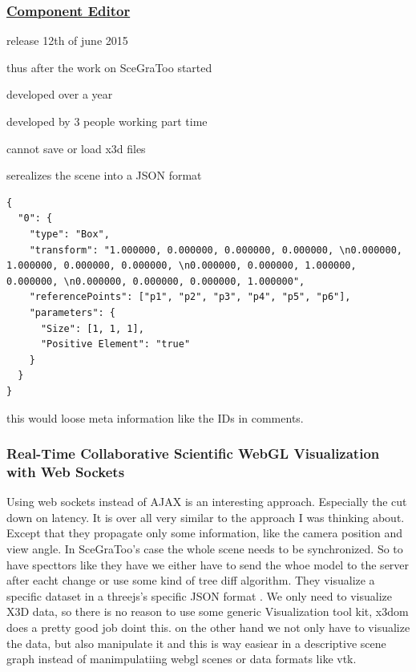 \clearpage
\subsubsection{\texorpdfstring{\href{https://github.com/x3dom/component-editor}{Component
Editor}}{Component Editor}}\label{component-editor30}

\begin{itemize*}
\item release 12th of june 2015
\item thus after the work on SceGraToo started
\item developed over a year
\item developed by 3 people working part time
\item cannot save or load x3d files
\item serealizes the scene into a JSON format
\end{itemize*}

\begin{verbatim}
{
  "0": {
    "type": "Box",
    "transform": "1.000000, 0.000000, 0.000000, 0.000000, \n0.000000, 1.000000, 0.000000, 0.000000, \n0.000000, 0.000000, 1.000000, 0.000000, \n0.000000, 0.000000, 0.000000, 1.000000",
    "referencePoints": ["p1", "p2", "p3", "p4", "p5", "p6"],
    "parameters": {
      "Size": [1, 1, 1],
      "Positive Element": "true"
    }
  }
}
\end{verbatim}

\begin{itemize*}
\item
  this would loose meta information like the IDs in comments.
\end{itemize*}

\subsubsection{Real-Time Collaborative Scientific WebGL
Visualization with Web Sockets}
\label{rtcswvwws}

Using web sockets instead of AJAX is an interesting approach. \cite{Marion:2012:RCS:2338714.2338721} Especially
the cut down on latency. It is over all very similar to the approach I
was thinking about. Except that they propagate only some information,
like the camera position and view angle. In SceGraToo's case the whole
scene needs to be synchronized. So to have specttors like they have we
either have to send the whoe model to the server after eacht change or
use some kind of tree diff algorithm. They visualize a specific dataset
in a threejs's specific JSON format \cite{threejs-format}. We only need to visualize X3D
data, so there is no reason to use some generic Visualization tool kit,
x3dom does a pretty good job doint this. on the other hand we not only
have to visualize the data, but also manipulate it and this is way
easiear in a descriptive scene graph instead of manimpulatiing webgl
scenes or data formats like vtk.

